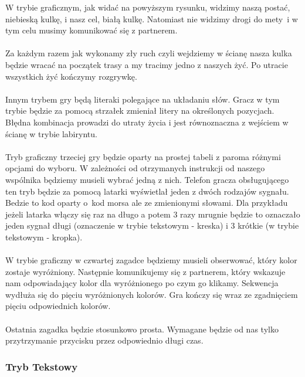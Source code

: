 \hspace{-0.60cm}W trybie graficznym, jak widać na powyższym rysunku, widzimy naszą postać, niebieską kulkę, i nasz cel, białą kulkę. Natomiast nie widzimy drogi do mety~i w tym celu musimy komunikować się z partnerem.
\\
\\
Za każdym razem jak wykonamy zły ruch czyli wejdziemy w ścianę nasza kulka będzie wracać na początek trasy a my tracimy jedno z naszych żyć. Po utracie wszystkich żyć kończymy rozgrywkę.
\\
\\
Innym trybem gry będą literaki polegające na układaniu słów. Gracz w tym trybie będzie za pomocą strzałek zmieniał litery na określonych pozycjach. Błędna kombinacja prowadzi do utraty życia i jest równoznaczna z wejściem w ścianę w trybie labiryntu.
\\
\\
Tryb graficzny trzeciej gry będzie oparty na prostej tabeli z paroma różnymi opcjami do wyboru. W zależności od otrzymanych instrukcji od naszego wspólnika będziemy musieli wybrać jedną z nich. Telefon gracza obsługującego ten tryb będzie za pomocą latarki wyświetlał jeden z dwóch rodzajów sygnału. Bedzie to kod oparty o~kod morsa ale ze zmienionymi słowami. Dla przykładu jeżeli latarka włączy się raz na długo a potem 3 razy mrugnie będzie to oznaczało jeden sygnał długi (oznaczenie w trybie tekstowym - kreska) i 3 krótkie (w trybie tekstowym - kropka).
\\
\\
W trybie graficzny w czwartej zagadce będziemy musieli obserwować, który kolor zostaje wyróżniony. Następnie komunikujemy się z partnerem, który wskazuje nam odpowiadający kolor dla wyróżnionego po czym go klikamy. Sekwencja wydłuża się do pięciu wyróżnionych kolorów. Gra kończy się wraz ze zgadnięciem pięciu odpowiednich kolorów.
\\
\\
Ostatnia zagadka będzie stosunkowo prosta. Wymagane będzie od nas tylko przytrzymanie przycisku przez odpowiednio długi czas.
\subsubsection{Tryb Tekstowy}  %

